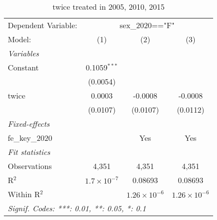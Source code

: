 
\begin{table}[htbp]
   \caption{twice treated in 2005, 2010, 2015}
   \centering
   \begin{tabular}{lccc}
      \tabularnewline \midrule \midrule
      Dependent Variable: & \multicolumn{3}{c}{sex\_2020=="F"}\\
      Model:          & (1)                  & (2)                   & (3)\\  
      \midrule
      \emph{Variables}\\
      Constant        & 0.1059$^{***}$       &                       &   \\   
                      & (0.0054)             &                       &   \\   
      twice           & 0.0003               & -0.0008               & -0.0008\\   
                      & (0.0107)             & (0.0107)              & (0.0112)\\   
      \midrule
      \emph{Fixed-effects}\\
      fe\_key\_2020   &                      & Yes                   & Yes\\  
      \midrule
      \emph{Fit statistics}\\
      Observations    & 4,351                & 4,351                 & 4,351\\  
      R$^2$           & $1.7\times 10^{-7}$  & 0.08693               & 0.08693\\  
      Within R$^2$    &                      & $1.26\times 10^{-6}$  & $1.26\times 10^{-6}$\\   
      \midrule \midrule
      \multicolumn{4}{l}{\emph{Signif. Codes: ***: 0.01, **: 0.05, *: 0.1}}\\
   \end{tabular}
\end{table}


